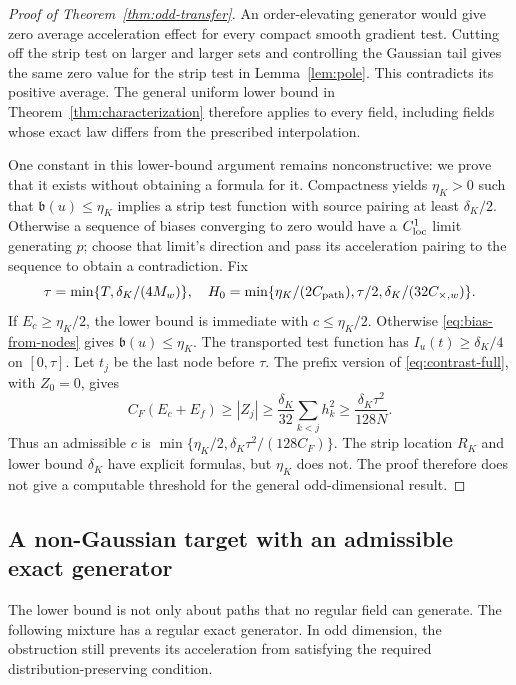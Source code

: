 \begin{proof}[Proof of Theorem~\ref{thm:odd-transfer}]
An order-elevating generator would give zero average acceleration effect
for every compact smooth gradient test. Cutting off the strip test on
larger and larger sets and controlling the Gaussian tail gives the same
zero value for the strip test in Lemma~\ref{lem:pole}. This contradicts
its positive average.
The general uniform lower bound in Theorem~\ref{thm:characterization}
therefore applies to every field, including fields whose exact law differs
from the prescribed interpolation.

One constant in this lower-bound argument remains nonconstructive: we prove
that it exists without obtaining a formula for it. Compactness yields
$\eta_K>0$ such that $\mathfrak b(u)\le\eta_K$ implies a strip test function
with source pairing at least $\delta_K/2$. Otherwise a sequence of biases
converging to zero would have a $C^1_{\rm loc}$ limit generating $p$;
choose that limit's direction and pass its acceleration pairing to the
sequence to obtain a contradiction. Fix
\[
 \tau=\min\{T,\delta_K/(4M_w)\},\quad
 H_0=\min\{\eta_K/(2C_{\rm path}),\tau/2,
                  \delta_K/(32C_{\times,w})\}.
\]
If $E_c\ge\eta_K/2$, the lower bound is immediate with $c\le\eta_K/2$.
Otherwise \eqref{eq:bias-from-nodes} gives $\mathfrak b(u)\le\eta_K$.
The transported test function has $I_u(t)\ge\delta_K/4$ on $[0,\tau]$.
Let $t_j$ be the last node before $\tau$. The prefix version of
\eqref{eq:contrast-full}, with $Z_0=0$, gives
\[
 C_F(E_c+E_f)\ge|Z_j|\ge\frac{\delta_K}{32}\sum_{k<j}h_k^2
 \ge\frac{\delta_K\tau^2}{128N}.
\]
Thus an admissible $c$ is
$\min\{\eta_K/2,\delta_K\tau^2/(128C_F)\}$.
The strip location $R_K$ and lower bound $\delta_K$ have explicit formulas,
but $\eta_K$ does not. The proof therefore does not give a computable
threshold for the general odd-dimensional result.
\end{proof}

\subsection{A non-Gaussian target with an admissible exact generator}
The lower bound is not only about paths that no regular field can generate.
The following mixture has a regular exact generator. In odd dimension, the
obstruction still prevents its acceleration from satisfying the required
distribution-preserving condition.

